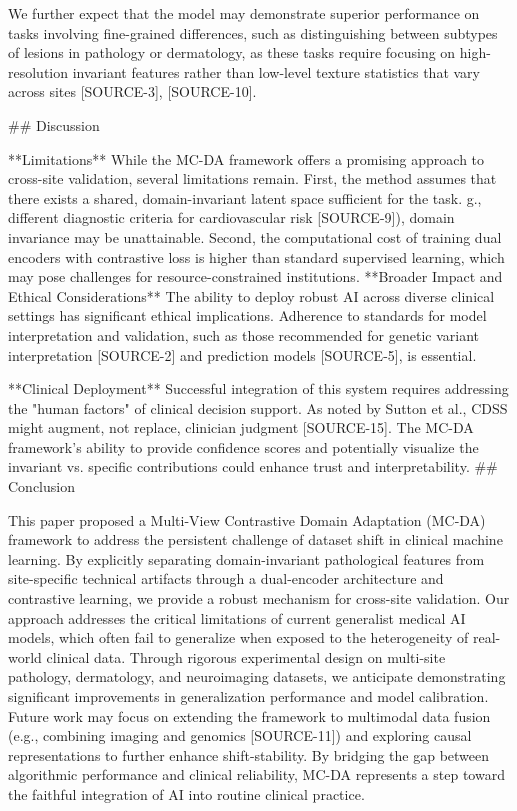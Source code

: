 \documentclass{article}
\begin{document}
We further expect that the model may demonstrate superior performance on tasks involving fine-grained differences, such as distinguishing between subtypes of lesions in pathology or dermatology, as these tasks require focusing on high-resolution invariant features rather than low-level texture statistics that vary across sites [SOURCE-3], [SOURCE-10].

\#\# Discussion

**Limitations**
While the MC-DA framework offers a promising approach to cross-site validation, several limitations remain. First, the method assumes that there exists a shared, domain-invariant latent space sufficient for the task. g., different diagnostic criteria for cardiovascular risk [SOURCE-9]), domain invariance may be unattainable. Second, the computational cost of training dual encoders with contrastive loss is higher than standard supervised learning, which may pose challenges for resource-constrained institutions. **Broader Impact and Ethical Considerations**
The ability to deploy robust AI across diverse clinical settings has significant ethical implications.  Adherence to standards for model interpretation and validation, such as those recommended for genetic variant interpretation [SOURCE-2] and prediction models [SOURCE-5], is essential.

**Clinical Deployment**
Successful integration of this system requires addressing the "human factors" of clinical decision support. As noted by Sutton et al., CDSS might augment, not replace, clinician judgment [SOURCE-15]. The MC-DA framework's ability to provide confidence scores and potentially visualize the invariant vs. specific contributions could enhance trust and interpretability. \#\# Conclusion

This paper proposed a Multi-View Contrastive Domain Adaptation (MC-DA) framework to address the persistent challenge of dataset shift in clinical machine learning. By explicitly separating domain-invariant pathological features from site-specific technical artifacts through a dual-encoder architecture and contrastive learning, we provide a robust mechanism for cross-site validation. Our approach addresses the critical limitations of current generalist medical AI models, which often fail to generalize when exposed to the heterogeneity of real-world clinical data. Through rigorous experimental design on multi-site pathology, dermatology, and neuroimaging datasets, we anticipate demonstrating significant improvements in generalization performance and model calibration. Future work may focus on extending the framework to multimodal data fusion (e.g., combining imaging and genomics [SOURCE-11]) and exploring causal representations to further enhance shift-stability. By bridging the gap between algorithmic performance and clinical reliability, MC-DA represents a step toward the faithful integration of AI into routine clinical practice.
\end{document}

